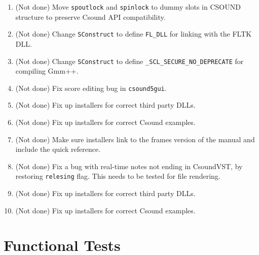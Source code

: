 \documentclass[11pt,letterpaper,onecolumn]{scrartcl}
\begin{document}
\begin{sloppypar}
\begin{enumerate}
	\item (Not done) Move \texttt{spoutlock} and \texttt{spinlock} to dummy slots in CSOUND structure to preserve Csound API compatibility.
	\item (Not done) Change \texttt{SConstruct} to define \verb|FL_DLL| for linking with the FLTK DLL.
	\item (Not done) Change \texttt{SConstruct} to define \verb|_SCL_SECURE_NO_DEPRECATE| for compiling Gmm++.
	\item (Not done) Fix score editing bug in \texttt{csound5gui}.
	\item (Not done) Fix up installers for correct third party DLLs.
	\item (Not done) Fix up installers for correct Csound examples.
	\item (Not done) Make sure installers link to the frames version of the manual and include the quick reference.
	\item (Not done) Fix a bug with real-time notes not ending in CsoundVST, by restoring \texttt{relesing} flag. This needs to be tested for file rendering.
	\item (Not done) Fix up installers for correct third party DLLs.
	\item (Not done) Fix up installers for correct Csound examples.
\end{enumerate}

\section{Functional Tests}
\label{sec:FunctionalTests}


\end{sloppypar}
\end{document}
